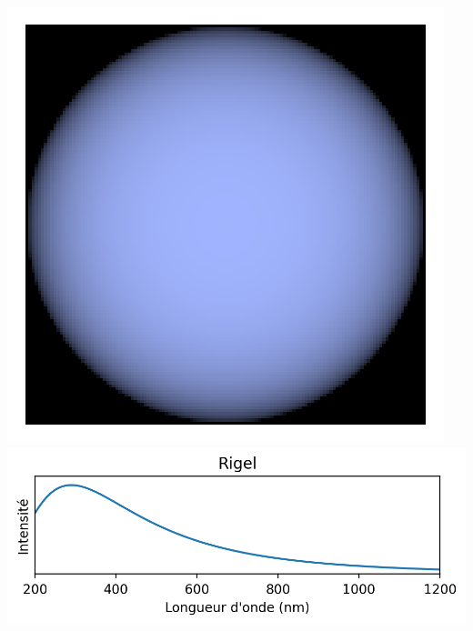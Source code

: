 \documentclass[12pt,a4paper,fleqn]{article}
\begin{document}
\begin{center}
\includegraphics[height=\localheight]{images/star_rigel.png}
\includegraphics[height=\localheight]{images/spectrum_star_curve_rigel.png}


\end{center}
\end{document}
